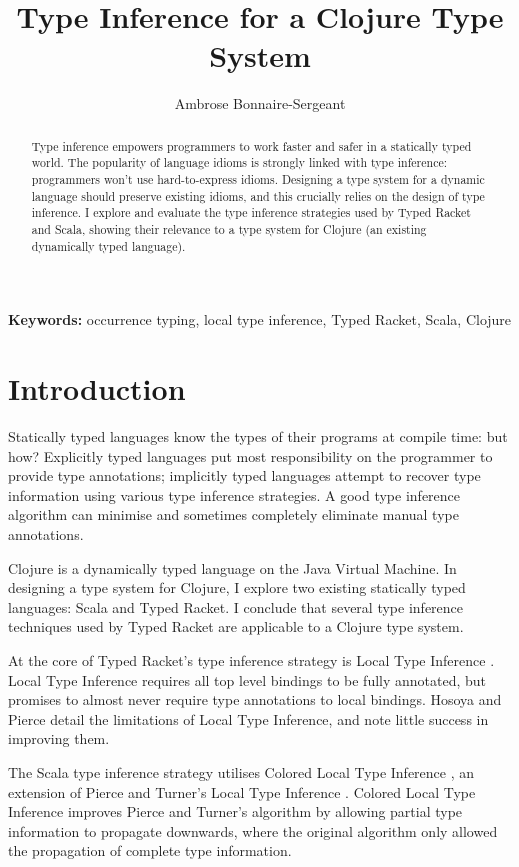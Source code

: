\documentclass[12pt,a4paper]{article}
\title{Type Inference for a Clojure Type System}
\author{Ambrose Bonnaire-Sergeant}
\begin{document}
\maketitle

\begin{abstract}
  
  Type inference empowers programmers to work faster and safer in a statically 
  typed world. The popularity of language idioms is strongly linked
  with type inference: programmers won't use hard-to-express idioms.
  Designing a type system for a dynamic language should preserve existing idioms, 
  and this crucially relies on the design of type inference.
  I explore and evaluate the type inference strategies
  used by Typed Racket and Scala, showing their relevance to a type system for Clojure
  (an existing dynamically typed language).

\end{abstract}

{\bf Keywords:} occurrence typing, local type inference, Typed Racket, Scala, Clojure

\section{Introduction}

Statically typed languages know the types of their programs
at compile time: but how? Explicitly typed languages
put most responsibility on the programmer
to provide type annotations; implicitly typed languages attempt to
recover type information using various type inference strategies. 
A good type inference algorithm can minimise and sometimes completely
eliminate manual type annotations.

Clojure is a dynamically typed language on the Java Virtual Machine.
In designing a type system for Clojure, I explore two existing statically typed
languages: Scala and Typed Racket.
I conclude that several type inference techniques used by Typed Racket
are applicable to a Clojure type system.

At the core of Typed Racket's type inference strategy is Local Type Inference
\cite{Pierce:2000:LTI:345099.345100}.
Local Type Inference requires all top level bindings to be fully annotated,
but promises to almost never require type annotations to local bindings.
Hosoya and Pierce detail the limitations of Local Type Inference,
and note little success in improving them\cite{Hosoya99howgood}.

The Scala type inference strategy utilises Colored Local Type Inference
\cite{Odersky:2001:CLT:373243.360207}, an extension of Pierce and 
Turner's Local Type Inference
\cite{Pierce:2000:LTI:345099.345100}.
Colored Local Type Inference improves Pierce and Turner's algorithm
by allowing partial type information to propagate downwards, where
the original algorithm only allowed the propagation of complete type information.
\end{document}
